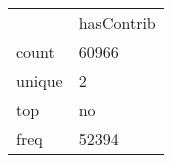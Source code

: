 \begin{tabular}{ll}
 & hasContrib \\
count & 60966 \\
unique & 2 \\
top & no \\
freq & 52394 \\
\end{tabular}
